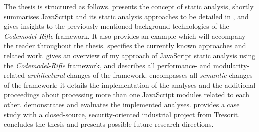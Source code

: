 The thesis is structured as follows. \emph{} presents the concept of static analysis, shortly summarises JavaScript and its static analysis approaches to be detailed in , and gives insights to the previously mentioned background technologies of the \emph{Codemodel-Rifle} framework. It also provides an example which will accompany the reader throughout the thesis. \emph{} specifies the currently known approaches and related work. \emph{} gives an overview of my approach of JavaScript static analysis using the \emph{Codemodel-Rifle} framework, and describes all performance- and modularity-related \emph{architectural} changes of the framework. \emph{} encompasses all \emph{semantic} changes of the framework: it details the implementation of the analyses and the additional proceedings about processing more than one JavaScript modules related to each other. \emph{} demonstrates and evaluates the implemented analyses. \emph{} provides a case study with a closed-source, security-oriented industrial project from Tresorit. \emph{} concludes the thesis and presents possible future research directions.

